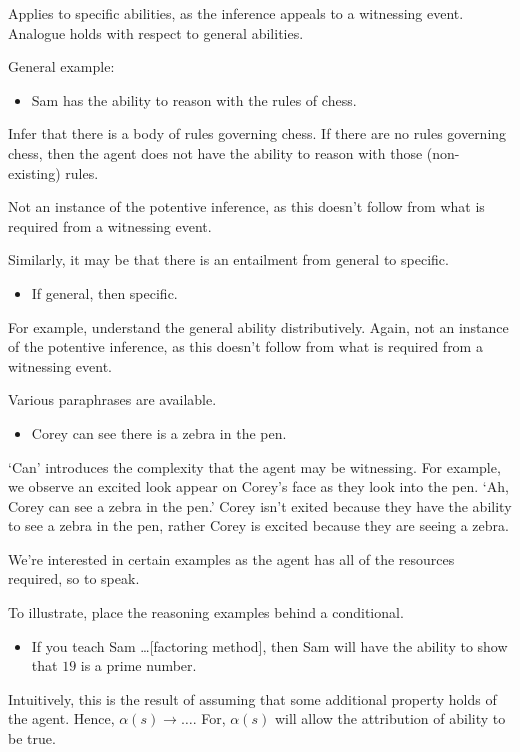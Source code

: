 \begin{note}
  Applies to specific abilities, as the inference appeals to a witnessing event.
  Analogue holds with respect to general abilities.

  General example:
  \begin{itemize}
  \item Sam has the ability to reason with the rules of chess.
  \end{itemize}
  Infer that there is a body of rules governing chess.
  If there are no rules governing chess, then the agent does not have the ability to reason with those (non-existing) rules.

  Not an instance of the potentive inference, as this doesn't follow from what is required from a witnessing event.

  Similarly, it may be that there is an entailment from general to specific.
  \begin{itemize}
  \item If general, then specific.
  \end{itemize}
  For example, understand the general ability distributively.
  Again, not an instance of the potentive inference, as this doesn't follow from what is required from a witnessing event.
\end{note}

\begin{note}
  Various paraphrases are available.
  \begin{itemize}
  \item Corey can see there is a zebra in the pen.
  \end{itemize}
  `Can' introduces the complexity that the agent may be witnessing.
  For example, we observe an excited look appear on Corey's face as they look into the pen.
  `Ah, Corey can see a zebra in the pen.'
  Corey isn't exited because they have the ability to see a zebra in the pen, rather Corey is excited because they are seeing a zebra.
\end{note}

\begin{note}
  We're interested in certain examples as the agent has all of the resources required, so to speak.

  To illustrate, place the reasoning examples behind a conditional.
  \begin{itemize}
  \item If you teach Sam \dots [factoring method], then Sam will have the ability to show that \(19\) is a prime number.
  \end{itemize}
  Intuitively, this is the result of assuming that some additional property holds of the agent.
  Hence, \(\alpha(s) \rightarrow \dots\).
  For, \(\alpha(s)\) will allow the attribution of ability to be true.
\end{note}

